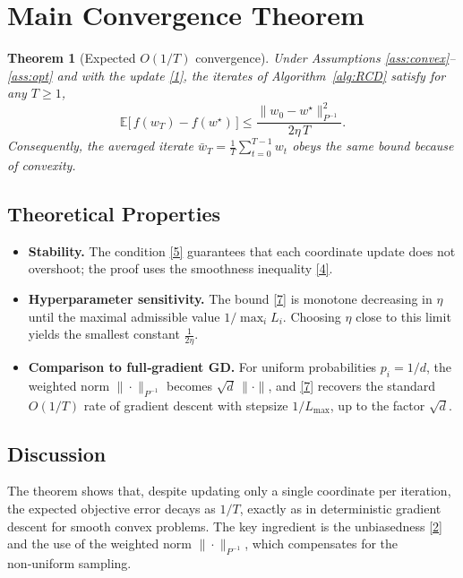 \documentclass{article}
\newtheorem{theorem}{Theorem}
\newcommand{\E}{\mathbb{E}}
\begin{document}
\section*{Main Convergence Theorem}

\begin{theorem}[Expected $O(1/T)$ convergence]\label{thm:main}
Under Assumptions \ref{ass:convex}–\ref{ass:opt} and with the update
\eqref{1}, the iterates of Algorithm~\ref{alg:RCD} satisfy for any
$T\ge1$,
\[
\E\big[\,f(w_{T})-f(w^\star)\,\big]\le
\frac{\|w_{0}-w^\star\|_{P^{-1}}^{2}}{2\eta\,T}.
\tag{7}
\]
Consequently, the averaged iterate
$\bar w_T=\frac1T\sum_{t=0}^{T-1}w_t$ obeys the same bound because of convexity.
\end{theorem}

\subsection*{Theoretical Properties}
\begin{itemize}[leftmargin=*]
\item \textbf{Stability.} The condition \eqref{5} guarantees that each
coordinate update does not overshoot; the proof uses the smoothness
inequality \eqref{4}.
\item \textbf{Hyperparameter sensitivity.} The bound \eqref{7} is monotone
decreasing in $\eta$ until the maximal admissible value $1/\max_i L_i$.
Choosing $\eta$ close to this limit yields the smallest constant
$\frac{1}{2\eta}$.
\item \textbf{Comparison to full‑gradient GD.} For uniform probabilities
$p_i=1/d$, the weighted norm $\|\cdot\|_{P^{-1}}$ becomes $\sqrt{d}\,\|\cdot\|$,
and \eqref{7} recovers the standard $O(1/T)$ rate of gradient descent with
stepsize $1/L_{\max}$, up to the factor $\sqrt{d}$.
\end{itemize}

\subsection*{Discussion}
The theorem shows that, despite updating only a single coordinate per
iteration, the expected objective error decays as $1/T$, exactly as in
deterministic gradient descent for smooth convex problems. The key
ingredient is the unbiasedness \eqref{2} and the use of the weighted norm
$\|\cdot\|_{P^{-1}}$, which compensates for the non‑uniform sampling.
\end{document}
